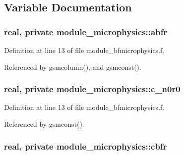 \subsection{Variable Documentation}
\subsubsection[{\texorpdfstring{abfr}{abfr}}]{\setlength{\rightskip}{0pt plus 5cm}real, private module\+\_\+microphysics\+::abfr\hspace{0.3cm}{\ttfamily [private]}}\hypertarget{namespacemodule__microphysics_a8f4f8d798ec89d8bb550fa6b6f8eda06}{}\label{namespacemodule__microphysics_a8f4f8d798ec89d8bb550fa6b6f8eda06}


Definition at line 13 of file module\+\_\+bfmicrophysics.\+f.



Referenced by gsmcolumn(), and gsmconst().

\subsubsection[{\texorpdfstring{c\+\_\+n0r0}{c_n0r0}}]{\setlength{\rightskip}{0pt plus 5cm}real, private module\+\_\+microphysics\+::c\+\_\+n0r0\hspace{0.3cm}{\ttfamily [private]}}\hypertarget{namespacemodule__microphysics_ac36c8de45d04aab21833d22133311284}{}\label{namespacemodule__microphysics_ac36c8de45d04aab21833d22133311284}


Definition at line 13 of file module\+\_\+bfmicrophysics.\+f.



Referenced by gsmconst().

\subsubsection[{\texorpdfstring{cbfr}{cbfr}}]{\setlength{\rightskip}{0pt plus 5cm}real, private module\+\_\+microphysics\+::cbfr\hspace{0.3cm}{\ttfamily [private]}}\hypertarget{namespacemodule__microphysics_afdcb4cd9370ca50745e65221becb6eae}{}\label{namespacemodule__microphysics_afdcb4cd9370ca50745e65221becb6eae}


